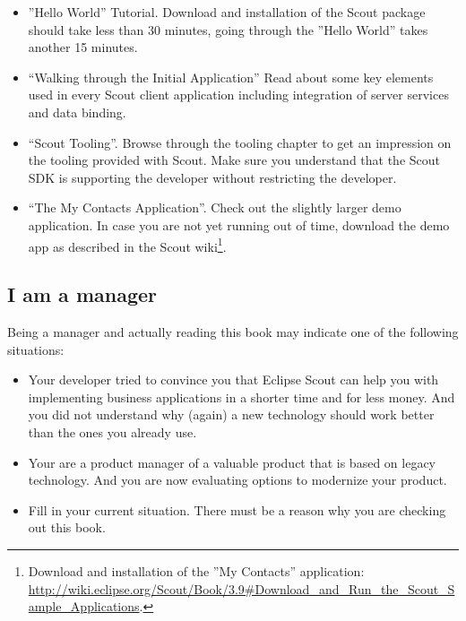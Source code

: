 \documentclass[a4paper,10pt,twoside]{book}
\begin{document}
\begin{itemize}
  \item {} ''Hello World'' Tutorial. 
      Download and installation of the Scout package should take less than 30 minutes, going through the ''Hello World'' takes another 15 minutes. 
  \item {} ``Walking through the Initial Application''
      Read about some key elements used in every Scout client application including integration of server services and data binding.
  \item {} ``Scout Tooling''.
      Browse through the tooling chapter to get an impression on the tooling provided with Scout. 
	  Make sure you understand that the Scout SDK is supporting the developer without restricting the developer.
  \item {} ``The My Contacts Application''. 
      Check out the slightly larger demo application. 
	  In case you are not yet running out of time, download the demo app as described in the Scout wiki\footnote{
		Download and installation of the ''My Contacts'' application: \url{http://wiki.eclipse.org/Scout/Book/3.9\#Download_and_Run_the_Scout_Sample_Applications}.
	  }.
\end{itemize}

\subsection{I am a manager}

Being a manager and actually reading this book may indicate one of the following situations:

\begin{itemize}
  \item Your developer tried to convince you that Eclipse Scout can help you with implementing business applications in a shorter time and for less money.
        And you did not understand why (again) a new technology should work better than the ones you already use. 
  \item Your are a product manager of a valuable product that is based on legacy technology. 
        And you are now evaluating options to modernize your product.
  \item Fill in your current situation. There must be a reason why you are checking out this book.
\end{itemize}
\end{document}

